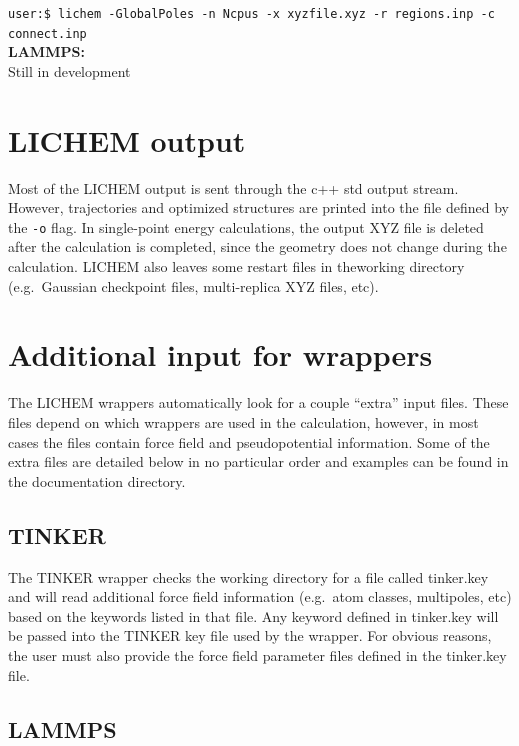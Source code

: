 \documentclass[12pt]{report}
\begin{document}
\texttt{user:\$ lichem -GlobalPoles -n Ncpus
-x xyzfile.xyz -r regions.inp
 -c connect.inp} \\

{\textbf{LAMMPS:}} \\

{\color{red}Still in development}

\section{LICHEM output}

Most of the LICHEM output is sent through the c++ std output stream.
However, trajectories and optimized structures are printed into the file
defined by the \texttt{-o} flag.
In single-point energy calculations, the output XYZ file is deleted after the
calculation is completed, since the geometry does not change during the
calculation.
LICHEM also leaves some restart files in theworking directory (e.g.\ Gaussian
checkpoint files, multi-replica XYZ files, etc).

\section{Additional input for wrappers}

The LICHEM wrappers automatically look for a couple ``extra'' input files.
These files depend on which wrappers are used in the calculation, however, in
most cases the files contain force field and pseudopotential information.
Some of the extra files are detailed below in no particular order and examples
can be found in the documentation directory.

\subsection{TINKER}

The TINKER wrapper checks the working directory for a file called tinker.key
and will read additional force field information (e.g.\ atom classes,
multipoles, etc) based on the keywords listed in that file.
Any keyword defined in tinker.key will be passed into the TINKER key file used
by the wrapper.
For obvious reasons, the user must also provide the force field parameter
files defined in the tinker.key file.

\subsection{LAMMPS}
\end{document}
